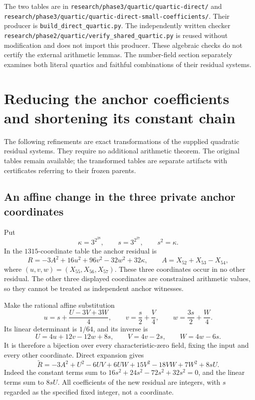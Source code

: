 \documentclass[11pt]{article}
\theoremstyle{definition}
\begin{document}
The two tables are in
\nolinkurl{research/phase3/quartic/quartic-direct/} and
\nolinkurl{research/phase3/quartic/quartic-direct-small-coefficients/}.
Their producer is \nolinkurl{build_direct_quartic.py}.
The independently written checker
\nolinkurl{research/phase2/quartic/verify_shared_quartic.py}
is reused without modification and does not import this producer.
These algebraic checks do not certify the external arithmetic
lemmas. The number-field section separately examines both
literal quartics and faithful combinations of their residual systems.


\section{Reducing the anchor coefficients and shortening its constant chain}
\label{sec:p3-affine-anchor-refinement}

The following refinements are exact transformations of the supplied
quadratic residual systems.  They require no additional arithmetic
theorem.  The original tables remain available; the transformed
tables are separate artifacts with certificates referring to their
frozen parents.

\subsection{An affine change in the three private anchor coordinates}

Put
\[
 \kappa=3^{2^{28}},\qquad s=3^{2^{27}},\qquad s^2=\kappa.
\]
In the $1315$-coordinate table the anchor residual is
\[
 R=-3A^2+16u^2+96v^2-32w^2+32\kappa,
 \qquad A=X_{52}+X_{53}-X_{54},
\]
where $(u,v,w)=(X_{55},X_{56},X_{57})$.  These three coordinates
occur in no other residual.  The other three displayed coordinates
are constrained arithmetic values, so they cannot be treated as
independent anchor witnesses.

Make the rational affine substitution
\begin{equation}\label{eq:p3-anchor-affine-map}
 u=s+\frac{U-3V+3W}{4},\qquad
 v=\frac{s}{2}+\frac V4,\qquad
 w=\frac{3s}{2}+\frac W4.
\end{equation}
Its linear determinant is $1/64$, and its inverse is
\[
 U=4u+12v-12w+8s,\qquad V=4v-2s,\qquad W=4w-6s.
\]
It is therefore a bijection over every characteristic-zero field,
fixing the input and every other coordinate.  Direct expansion gives
\begin{equation}\label{eq:p3-translated-anchor}
 \widetilde R=-3A^2+U^2-6UV+6UW+15V^2-18VW+7W^2+8sU.
\end{equation}
Indeed the constant terms sum to
$16s^2+24s^2-72s^2+32s^2=0$, and the linear terms sum to $8sU$.
All coefficients of the new residual are integers, with $s$ regarded
as the specified fixed integer, not a coordinate.
\end{document}
